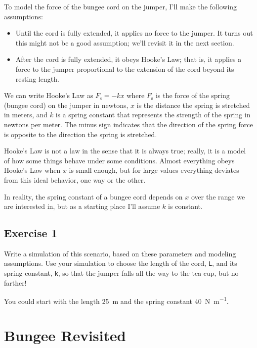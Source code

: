 To model the force of the bungee cord on the jumper, I'll make the following assumptions:

\begin{itemize}

\item Until the cord is fully extended, it applies no force to the jumper.  It turns out this might not be a good assumption; we'll revisit it in the next section.

\item After the cord is fully extended, it obeys Hooke's Law; that is, it applies a force to the jumper proportional to the extension of the cord beyond its resting length.

\end{itemize}

We can write Hooke's Law as
%
$F_\mathrm{s} = -k x$
%
where $F_\mathrm{s}$ is the force of the spring (bungee cord) on the jumper in newtons, $x$ is the distance the spring is stretched in meters, and $k$ is a spring constant that represents the strength of the spring in newtons per meter.
The minus sign indicates that the direction of the spring force is opposite to the direction the spring is stretched.


Hooke's Law is not  a law in the sense that it is always true; really, it is a model of how some things behave under some conditions.
Almost everything obeys Hooke's Law when $x$ is small enough, but for large values everything deviates from this ideal behavior, one way or the other.

In reality, the spring constant of a bungee cord depends on $x$ over the range we are interested in, but as a starting place I'll assume $k$ is constant.


\subsection{Exercise 1}

Write a simulation of this scenario, based on these parameters and modeling assumptions.
Use your simulation to choose the length of the cord, \lstinline{L}, and its spring constant, \lstinline{k}, so that the jumper falls all the way to the tea cup, but no farther!

You could start with the length \SI{25}{\meter} and the spring constant \SI{40}{\newton \per \meter}.


\section{Bungee Revisited}


